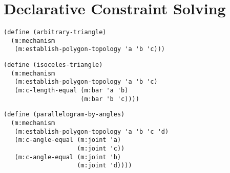 \section{Declarative Constraint Solving}

\begin{lstlisting}[caption=Getting labels]
(define (arbitrary-triangle)
  (m:mechanism
   (m:establish-polygon-topology 'a 'b 'c)))
\end{lstlisting}

\begin{lstlisting}[caption=Constraint Solving for Isoceles Triangle]
(define (isoceles-triangle)
  (m:mechanism
   (m:establish-polygon-topology 'a 'b 'c)
   (m:c-length-equal (m:bar 'a 'b)
                     (m:bar 'b 'c))))
\end{lstlisting}


\begin{lstlisting}[caption=Constraint Solving for Isoceles Triangle]
(define (parallelogram-by-angles)
  (m:mechanism
   (m:establish-polygon-topology 'a 'b 'c 'd)
   (m:c-angle-equal (m:joint 'a)
                    (m:joint 'c))
   (m:c-angle-equal (m:joint 'b)
                    (m:joint 'd))))
\end{lstlisting}
